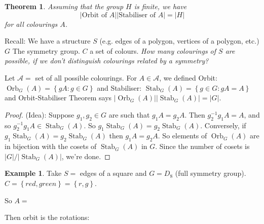 \documentclass{article}
\newtheorem{theorem}{Theorem}
\theoremstyle{definition} \newtheorem*{definition}{Definition}
\newtheorem*{exmp}{Example} \newtheorem*{exmps}{Examples}
\DeclareMathOperator{\Orb}{Orb} \DeclareMathOperator{\Stab}{Stab}
\begin{document}
 \begin{theorem} Assuming that the group $H$ is finite, we have \[
   \big|\text{Orbit of }A\big| \big|\text{Stabiliser of } A\big|=\big|H\big| \]
   for all colourings $A$.
  
   \label{thm:orbitstabiliser} \end{theorem}

 Recall: We have a structure $S$ (e.g. edges of a polygon, vertices of a
 polygon, etc.) $G$ The symmetry group. $C$ a set of colours. \emph{How many
 colourings of $S$ are possible, if we don't distinguish colourings related by
 a symmetry?}

 Let $\mathcal{A}=$ set of all possible colourings. For $A \in \mathcal{A}$, we
 defined Orbit: $\Orb_G(A)=\left\{ gA : g \in G \right\}$ and Stabiliser:
 $\Stab_G(A) = \left\{ g \in G : gA = A \right\}$ and Orbit-Stabiliser Theorem
 says $|\Orb_G(A)||\Stab_G(A)|=|G|$.

 \begin{proof} (Idea): Suppose $g_1,g_2\in G$ are such that $g_1A=g_2A$. Then
   $g_2^{-1}g_1A=A$, and so $g_2^{-1}g_1A \in \Stab_G(A)$. So
   $g_1\Stab_G(A)=g_2\Stab_G(A)$. Conversely, if $g_1\Stab_G(A)=g_2\Stab_G(A)$
   then $g_1A=g_2A$. So elements of $\Orb_G(A)$ are in bijection with the
   cosets of $\Stab_G(A)$ in $G$. Since the number of cosets is
   $|G|/|\Stab_G(A)|$, we're done.  \end{proof} 

 \begin{exmp} Take $S=$ edges of a square and $G=D_8$ (full symmetry group). $C
   = \left\{ red, green \right\}=\left\{ r,g \right\}$. 
   
   So $A=$ \begin{figure}[h] \centering {}
     \label{fig:coloursquare} \end{figure}
 
 \end{exmp}

  Then orbit is the rotations:
\end{document}
